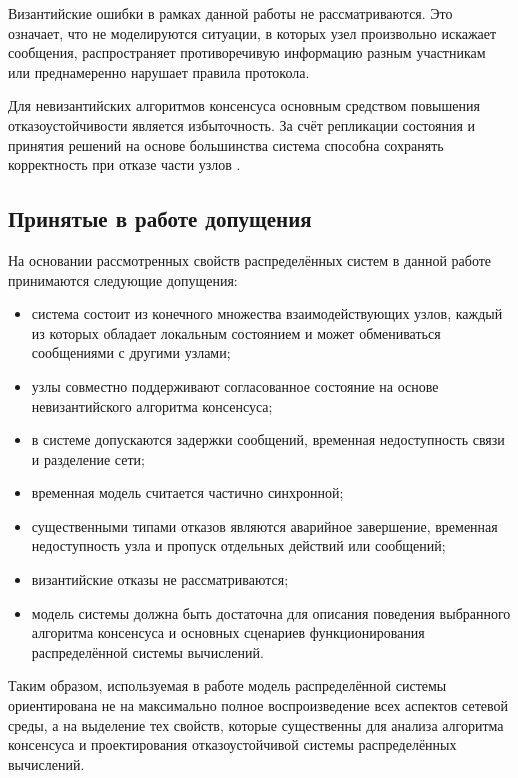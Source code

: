 Византийские ошибки в рамках данной работы не рассматриваются. Это означает,
что не моделируются ситуации, в которых узел произвольно искажает сообщения,
распространяет противоречивую информацию разным участникам или преднамеренно
нарушает правила протокола.

Для невизантийских алгоритмов консенсуса основным средством повышения
отказоустойчивости является избыточность. За счёт репликации
состояния и принятия решений на основе большинства система способна
сохранять корректность при отказе части узлов \cite{christian91}.

\subsection{Принятые в работе допущения}

На основании рассмотренных свойств распределённых систем в данной работе
принимаются следующие допущения:

\begin{itemize}
    \item система состоит из конечного множества взаимодействующих узлов,
каждый из которых обладает локальным состоянием и может обмениваться
сообщениями с другими узлами;
    \item узлы совместно поддерживают согласованное состояние на основе
невизантийского алгоритма консенсуса;
    \item в системе допускаются задержки сообщений, временная недоступность
связи и разделение сети;
    \item временная модель считается частично синхронной;
    \item существенными типами отказов являются аварийное завершение, временная
недоступность узла и пропуск отдельных действий или сообщений;
    \item византийские отказы не рассматриваются;
    \item модель системы должна быть достаточна для описания поведения
выбранного алгоритма консенсуса и основных сценариев функционирования
распределённой системы вычислений.
\end{itemize}

Таким образом, используемая в работе модель распределённой системы
ориентирована не на максимально полное воспроизведение всех аспектов сетевой
среды, а на выделение тех свойств, которые существенны для анализа алгоритма
консенсуса и проектирования отказоустойчивой системы распределённых вычислений.
